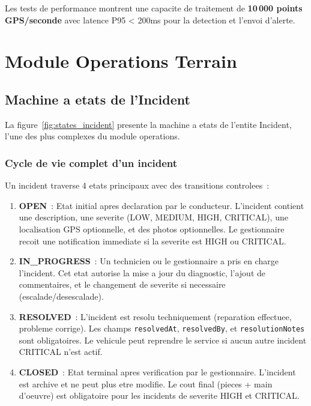 \documentclass[12pt,a4paper]{report}
\begin{document}
Les tests de performance montrent une capacite de traitement de
\textbf{10\,000 points GPS/seconde} avec latence P95 < 200ms pour
la detection et l'envoi d'alerte.

\chapter{Module Operations Terrain}

\section{Machine a etats de l'Incident}

La figure~\ref{fig:states_incident} presente la machine a etats
de l'entite Incident, l'une des plus complexes du module operations.

\subsection{Cycle de vie complet d'un incident}

Un incident traverse 4 etats principaux avec des transitions controlees~:

\begin{enumerate}[leftmargin=2cm]
  \item \textbf{OPEN}~: Etat initial apres declaration par le conducteur.
        L'incident contient une description, une severite (LOW, MEDIUM,
        HIGH, CRITICAL), une localisation GPS optionnelle, et des photos
        optionnelles. Le gestionnaire recoit une notification immediate
        si la severite est HIGH ou CRITICAL.
        
  \item \textbf{IN\_PROGRESS}~: Un technicien ou le gestionnaire a pris
        en charge l'incident. Cet etat autorise la mise a jour du diagnostic,
        l'ajout de commentaires, et le changement de severite si necessaire
        (escalade/desescalade).
        
  \item \textbf{RESOLVED}~: L'incident est resolu techniquement (reparation
        effectuee, probleme corrige). Les champs \texttt{resolvedAt},
        \texttt{resolvedBy}, et \texttt{resolutionNotes} sont obligatoires.
        Le vehicule peut reprendre le service si aucun autre incident
        CRITICAL n'est actif.
        
  \item \textbf{CLOSED}~: Etat terminal apres verification par le gestionnaire.
        L'incident est archive et ne peut plus etre modifie. Le cout final
        (pieces + main d'oeuvre) est obligatoire pour les incidents de
        severite HIGH et CRITICAL.
\end{enumerate}
\end{document}
